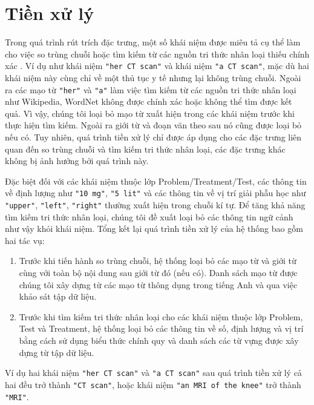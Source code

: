 \section{Tiền xử lý}
Trong quá trình rút trích đặc trưng, một số khái niệm được miêu tả cụ thể làm cho việc so trùng chuỗi hoặc tìm kiếm từ các nguồn tri thức nhân loại thiếu chính xác \cite{YanXu2012}. Ví dụ như khái niệm \texttt{"her CT scan"} và khái niệm \texttt{"a CT scan"}, mặc dù hai khái niệm này cùng chỉ về một thủ tục y tế nhưng lại không trùng chuỗi. Ngoài ra các mạo từ \texttt{"her"} và \texttt{"a"} làm việc tìm kiếm từ các nguồn tri thức nhân loại như Wikipedia, WordNet không được chính xác hoặc không thể tìm được kết quả. Vì vậy, chúng tôi loại bỏ mạo từ xuất hiện trong các khái niệm trước khi thực hiện tìm kiếm. Ngoài ra giới từ và đoạn văn theo sau nó cũng được loại bỏ nếu có. Tuy nhiên, quá trình tiền xử lý chỉ được áp dụng cho các đặc trưng liên quan đến so trùng chuỗi và tìm kiếm tri thức nhân loại, các đặc trưng khác không bị ảnh hưởng bởi quá trình này.

Đặc biệt đối với các khái niệm thuộc lớp Problem/Treatment/Test, các thông tin về định lượng như \texttt{"10 mg"}, \texttt{"5 lit"} và các thông tin về vị trí giải phẫu học như \texttt{"upper"}, \texttt{"left"}, \texttt{"right"} thường xuất hiện trong chuỗi kí tự. Để tăng khả năng tìm kiếm tri thức nhân loại, chúng tôi đề xuất loại bỏ các thông tin ngữ cảnh như vậy khỏi khái niệm. Tổng kết lại quá trình tiền xử lý của hệ thống bao gồm hai tác vụ:

\begin{enumerate}
\item Trước khi tiến hành so trùng chuỗi, hệ thống loại bỏ các mạo từ và giới từ cùng với toàn bộ nội dung sau giới từ đó (nếu có). Danh sách mạo từ được chúng tôi xây dựng từ các mạo từ thông dụng trong tiếng Anh và qua việc khảo sát tập dữ liệu.
\item Trước khi tìm kiếm tri thức nhân loại cho các khái niệm thuộc lớp Problem, Test và Treatment, hệ thống loại bỏ các thông tin về số, định lượng và vị trí bằng cách sử dụng biểu thức chính quy và danh sách các từ vựng được xây dựng từ tập dữ liệu.
\end{enumerate}

Ví dụ hai khái niệm \texttt{"her CT scan"} và \texttt{"a CT scan"} sau quá trình tiền xử lý cả hai đều trở thành \texttt{"CT scan"}, hoặc khái niệm \texttt{"an MRI of the knee"} trở thành \texttt{"MRI"}.

